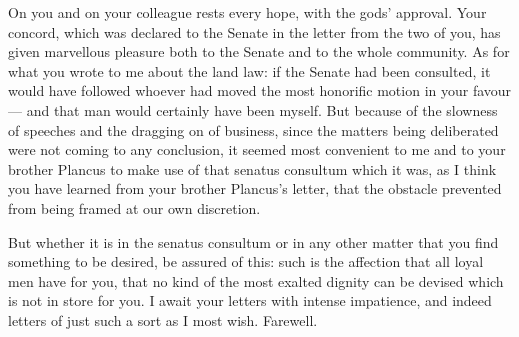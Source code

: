 

 On you and on your colleague rests every hope, with the gods' approval. Your concord, which was declared to the Senate in the letter from the two of you, has given marvellous pleasure both to the Senate and to the whole community. As for what you wrote to me about the land law: if the Senate had been consulted, it would have followed whoever had moved the most honorific motion in your favour --- and that man would certainly have been myself. But because of the slowness of speeches and the dragging on of business, since the matters being deliberated were not coming to any conclusion, it seemed most convenient to me and to your brother Plancus to make use of that senatus consultum which it was, as I think you have learned from your brother Plancus's letter, that the obstacle prevented from being framed at our own discretion.

 But whether it is in the senatus consultum or in any other matter that you find something to be desired, be assured of this: such is the affection that all loyal men have for you, that no kind of the most exalted dignity can be devised which is not in store for you. I await your letters with intense impatience, and indeed letters of just such a sort as I most wish. Farewell.
